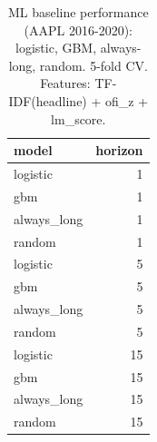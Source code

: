\begin{table}[htbp]
\centering
\caption{ML baseline performance (AAPL 2016-2020): logistic, GBM, always-long, random. 5-fold CV. Features: TF-IDF(headline) + ofi\_z + lm\_score.}
\label{tab:baselines}
\begin{tabular}{lr}
\toprule
model & horizon \\
\midrule
logistic & 1 \\
gbm & 1 \\
always\_long & 1 \\
random & 1 \\
logistic & 5 \\
gbm & 5 \\
always\_long & 5 \\
random & 5 \\
logistic & 15 \\
gbm & 15 \\
always\_long & 15 \\
random & 15 \\
\bottomrule
\end{tabular}
\end{table}
